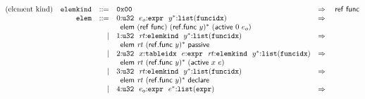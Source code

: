 $$
\begin{array}[t]{@{}lrrl@{}l@{}l@{}l@{}}
\mbox{(element kind)} & {\mathtt{elemkind}} & ::= & \mathtt{0x00} & \quad\Rightarrow\quad{} & \mathsf{ref}~\mathsf{func} \\
& {\mathtt{elem}} & ::= & 0{:}{\mathtt{u32}}~~e_o{:}{\mathtt{expr}}~~{y^\ast}{:}{\mathtt{list}}({\mathtt{funcidx}}) & \quad\Rightarrow\quad{} & & \\
&&& \multicolumn{4}{@{}l@{}}{\quad
\begin{array}[t]{@{}l@{}}
\mathsf{elem}~(\mathsf{ref}~\mathsf{func})~{(\mathsf{ref{.}func}~y)^\ast}~(\mathsf{active}~0~e_o) \\
\end{array}
} \\
& & | & 1{:}{\mathtt{u32}}~~{\mathit{rt}}{:}{\mathtt{elemkind}}~~{y^\ast}{:}{\mathtt{list}}({\mathtt{funcidx}}) & \quad\Rightarrow\quad{} & & \\
&&& \multicolumn{4}{@{}l@{}}{\quad
\begin{array}[t]{@{}l@{}}
\mathsf{elem}~{\mathit{rt}}~{(\mathsf{ref{.}func}~y)^\ast}~\mathsf{passive} \\
\end{array}
} \\
& & | & 2{:}{\mathtt{u32}}~~x{:}{\mathtt{tableidx}}~~e{:}{\mathtt{expr}}~~{\mathit{rt}}{:}{\mathtt{elemkind}}~~{y^\ast}{:}{\mathtt{list}}({\mathtt{funcidx}}) & \quad\Rightarrow\quad{} & & \\
&&& \multicolumn{4}{@{}l@{}}{\quad
\begin{array}[t]{@{}l@{}}
\mathsf{elem}~{\mathit{rt}}~{(\mathsf{ref{.}func}~y)^\ast}~(\mathsf{active}~x~e) \\
\end{array}
} \\
& & | & 3{:}{\mathtt{u32}}~~{\mathit{rt}}{:}{\mathtt{elemkind}}~~{y^\ast}{:}{\mathtt{list}}({\mathtt{funcidx}}) & \quad\Rightarrow\quad{} & & \\
&&& \multicolumn{4}{@{}l@{}}{\quad
\begin{array}[t]{@{}l@{}}
\mathsf{elem}~{\mathit{rt}}~{(\mathsf{ref{.}func}~y)^\ast}~\mathsf{declare} \\
\end{array}
} \\
& & | & 4{:}{\mathtt{u32}}~~e_{\mathsf{o}}{:}{\mathtt{expr}}~~{e^\ast}{:}{\mathtt{list}}({\mathtt{expr}}) & \quad\Rightarrow\quad{} & & \\
&&& \multicolumn{4}{@{}l@{}}{\quad
\begin{array}[t]{@{}l@{}}

\end{array}}
\end{array}$$
